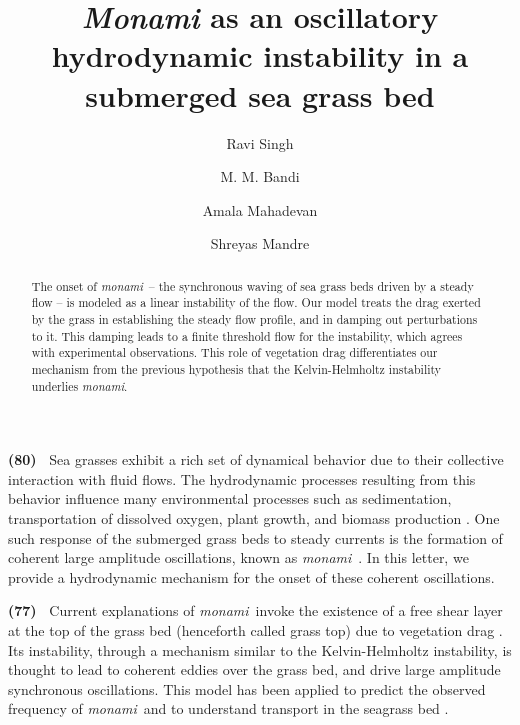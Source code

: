 \documentclass[aps,prl,reprint,twocolumn,superscriptaddress,sort&compress,10pt]{revtex4-1}  %
\newcommand{\monami}{\textit{monami}}
\newcommand{\words}[1]{\textbf{(#1)~}}
\begin{document}
\title{\textit{Monami} as an oscillatory hydrodynamic instability in a submerged sea grass bed}
\author{Ravi Singh}
\author{M. M. Bandi}
\author{Amala Mahadevan}
\author{Shreyas Mandre}

\begin{abstract}
The onset of \monami ~-- the synchronous waving of sea grass beds driven by a steady flow -- is modeled as a linear instability of the flow. Our model treats the drag exerted by the grass in establishing the steady flow profile, and in damping out perturbations to it. This damping leads to a finite threshold flow for the instability, which agrees with experimental observations. This role of vegetation drag differentiates our mechanism from the previous hypothesis that the Kelvin-Helmholtz instability underlies \monami.
\end{abstract}

\maketitle
\words{80} Sea grasses exhibit a rich set of dynamical behavior due to their collective interaction with fluid flows.  
The hydrodynamic processes resulting from this behavior influence many environmental processes such as sedimentation, transportation of dissolved oxygen, plant growth, and biomass production  \cite{Fonseca87,Grizzle96,Nepf99,Nepf2012}. 
One such response of the submerged grass beds to steady currents is the formation of coherent large amplitude oscillations, known as \monami ~\cite{AckermanOkubo93}.  
In this letter, we provide a hydrodynamic mechanism for the onset of these coherent oscillations.

\words{77} Current explanations of \monami ~invoke the existence of a free shear layer at the top of the grass bed (henceforth called grass top) due to vegetation drag  \cite{Ikeda96,Ghisal02,Raupach96}. 
Its instability, through a mechanism similar to the Kelvin-Helmholtz instability, is thought to lead to coherent eddies over the grass bed, and drive large amplitude synchronous oscillations.
This model has been applied to predict the observed frequency of \monami~and to understand transport in the seagrass bed \cite{Nepf00,Ghisal02,Nepf04,Okamoto12}.
\end{document}

